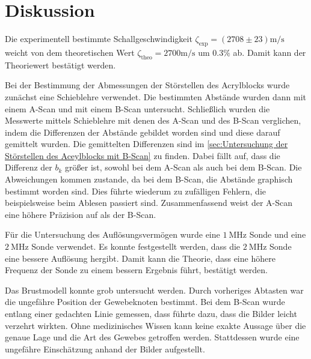 \section{Diskussion}
\label{sec:diskussion}

Die experimentell bestimmte Schallgeschwindigkeit $\zeta_{\text{exp}} = \left(2708 \pm 23\right) \si{\meter \per \second}$ weicht von dem 
theoretischen Wert $\zeta_{\text{theo}} = 2700 \si{\meter \per \second}$ \cite{scan} um $0.3 \%$ ab. Damit kann der Theoriewert bestätigt werden.

Bei der Bestimmung der Abmessungen der Störstellen des Acrylblocks wurde zunächst eine Schieblehre verwendet. Die bestimmten Abstände
wurden dann mit einem A-Scan und mit einem B-Scan untersucht. Schließlich wurden die Messwerte mittels Schieblehre mit denen des A-Scan und des 
B-Scan verglichen, indem die Differenzen der Abstände gebildet worden sind und diese darauf gemittelt wurden. Die gemittelten Differenzen 
sind im \autoref{sec:Untersuchung der Störstellen des Aceylblocks mit B-Scan} zu finden.
Dabei fällt auf, dass die Differenz der $b_k$ größer ist, sowohl bei dem A-Scan als auch bei dem B-Scan.
Die Abweichungen kommen zustande, da bei dem B-Scan, die Abstände graphisch bestimmt worden sind. Dies führte wiederum zu zufälligen Fehlern, die beispielsweise
beim Ablesen passiert sind. Zusammenfassend weist der A-Scan eine höhere Präzision auf als der B-Scan.

Für die Untersuchung des Auflösungsvermögen wurde eine $\SI{1}{\mega\hertz}$ Sonde und eine $\SI{2}{\mega\hertz}$ Sonde verwendet. 
Es konnte festgestellt werden, dass die $\SI{2}{\mega\hertz}$ Sonde eine bessere Auflösung hergibt.
Damit kann die Theorie, dass eine höhere Frequenz der Sonde zu einem bessern Ergebnis führt, bestätigt werden.

Das Brustmodell konnte grob untersucht werden. Durch vorheriges Abtasten war die ungefähre Position der Gewebeknoten bestimmt.
Bei dem B-Scan wurde entlang einer gedachten Linie gemessen, dass führte dazu, dass die Bilder leicht verzehrt wirkten. Ohne medizinisches Wissen 
kann keine exakte Aussage über die genaue Lage und die Art des Gewebes getroffen werden. Stattdessen wurde eine ungefähre Einschätzung anhand der Bilder 
aufgestellt.

\newpage
